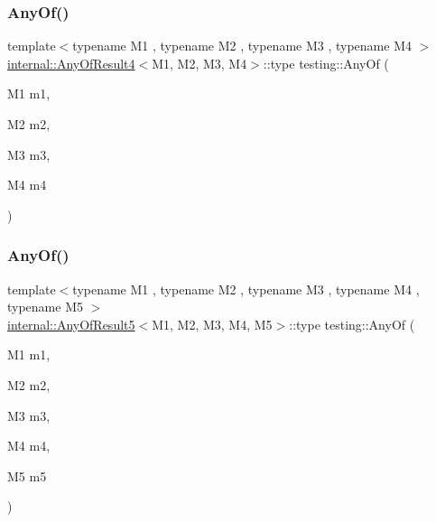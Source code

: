 \mbox{\label{namespacetesting_a1cfcacf2cf19543b86445e3585d5356f}} 
\subsubsection{\texorpdfstring{AnyOf()}{AnyOf()}\hspace{0.1cm}{\footnotesize\ttfamily [3/9]}}
{\footnotesize\ttfamily template$<$typename M1 , typename M2 , typename M3 , typename M4 $>$ \\
\mbox{\hyperlink{structtesting_1_1internal_1_1AnyOfResult4}{internal\+::\+Any\+Of\+Result4}}$<$M1, M2, M3, M4$>$\+::type testing\+::\+Any\+Of (\begin{DoxyParamCaption}\item[{M1}]{m1,  }\item[{M2}]{m2,  }\item[{M3}]{m3,  }\item[{M4}]{m4 }\end{DoxyParamCaption})\hspace{0.3cm}{\ttfamily [inline]}}

\mbox{\label{namespacetesting_a049ea436e52c242adc44b2b42dc03e50}} 
\subsubsection{\texorpdfstring{AnyOf()}{AnyOf()}\hspace{0.1cm}{\footnotesize\ttfamily [4/9]}}
{\footnotesize\ttfamily template$<$typename M1 , typename M2 , typename M3 , typename M4 , typename M5 $>$ \\
\mbox{\hyperlink{structtesting_1_1internal_1_1AnyOfResult5}{internal\+::\+Any\+Of\+Result5}}$<$M1, M2, M3, M4, M5$>$\+::type testing\+::\+Any\+Of (\begin{DoxyParamCaption}\item[{M1}]{m1,  }\item[{M2}]{m2,  }\item[{M3}]{m3,  }\item[{M4}]{m4,  }\item[{M5}]{m5 }\end{DoxyParamCaption})\hspace{0.3cm}{\ttfamily [inline]}}

\mbox{\label{namespacetesting_a747189264a49a426004366371f1a2575}} 
